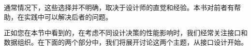 通常情况下，这些选择并不明确，取决于设计师的直觉和经验。本书对前者有帮助，在实践中可以解决后者的问题。 

正如您在本节中看到的，在考虑不同设计决策的性能影响时，我们经常关注接口和数据组织。在下面的两个部分中，我们将展开讨论这两个主题，从接口设计开始。









